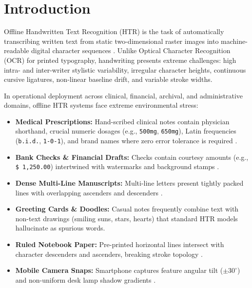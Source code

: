 \documentclass[default,iicol,sn-basic]{sn-jnl}
\begin{document}
{

\maketitle

\section{Introduction}\label{sec1}

Offline Handwritten Text Recognition (HTR) is the task of automatically transcribing written text from static two-dimensional raster images into machine-readable digital character sequences \cite{plamondon2000, memon2020}. Unlike Optical Character Recognition (OCR) for printed typography, handwriting presents extreme challenges: high intra- and inter-writer stylistic variability, irregular character heights, continuous cursive ligatures, non-linear baseline drift, and variable stroke widths.

In operational deployment across clinical, financial, archival, and administrative domains, offline HTR systems face extreme environmental stress:
\begin{itemize}
    \item \textbf{Medical Prescriptions:} Hand-scribed clinical notes contain physician shorthand, crucial numeric dosages (e.g., \texttt{500mg}, \texttt{650mg}), Latin frequencies (\texttt{b.i.d.}, \texttt{1-0-1}), and brand names where zero error tolerance is required \cite{bhunia2021}.
    \item \textbf{Bank Checks \& Financial Drafts:} Checks contain courtesy amounts (e.g., \texttt{\$ 1,250.00}) intertwined with watermarks and background stamps \cite{koerich2014}.
    \item \textbf{Dense Multi-Line Manuscripts:} Multi-line letters present tightly packed lines with overlapping ascenders and descenders \cite{romero2011}.
    \item \textbf{Greeting Cards \& Doodles:} Casual notes frequently combine text with non-text drawings (smiling suns, stars, hearts) that standard HTR models hallucinate as spurious words.
    \item \textbf{Ruled Notebook Paper:} Pre-printed horizontal lines intersect with character descenders and ascenders, breaking stroke topology \cite{zheng2013}.
    \item \textbf{Mobile Camera Snaps:} Smartphone captures feature angular tilt ($\pm 30^\circ$) and non-uniform desk lamp shadow gradients \cite{chen2019}.
\end{itemize}

}
\end{document}

